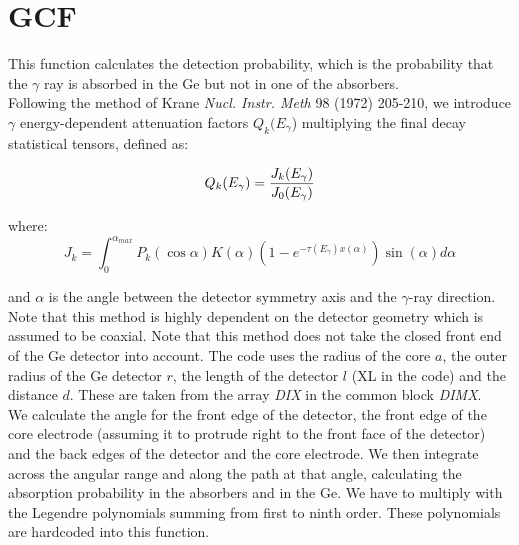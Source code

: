 \section{GCF}
\label{sect:gcf}

\noindent This function calculates the detection probability, which is the
probability that the $\gamma$ ray is absorbed in the Ge but not in one of
the absorbers.\\

\noindent Following the method of Krane {\em Nucl. Instr. Meth} 98 (1972)
205-210, we introduce $\gamma$ energy-dependent attenuation factors
$Q_k(E_\gamma$) multiplying the final decay statistical tensors, defined as:

\begin{equation}
Q_k(E_\gamma) = {J_k(E_\gamma) \over J_0(E_\gamma)}
\end{equation}

\noindent where:\\

\begin{equation}
J_k = \int_0^{\alpha_{max}}
P_k(\cos\alpha)
K(\alpha)
(1 - e^{-\tau(E_\gamma)x(\alpha)})
\sin(\alpha)
d\alpha
\end{equation}

\noindent and $\alpha$ is the angle between the detector symmetry axis and
the $\gamma$-ray direction.\\

\noindent Note that this method is highly dependent on the detector geometry
which is assumed to be coaxial. Note that this method does not take the
closed front end of the Ge detector into account. The code uses the radius
of the core $a$, the outer radius of the Ge detector $r$, the length of the
detector $l$ (XL in the code) and the distance $d$. These are taken from the
array {\em DIX} in the common block {\em DIMX}.\\

\noindent We calculate the angle for the front edge of the detector, the
front edge of the core electrode (assuming it to protrude right to the front
face of the detector) and the back edges of the detector and the core
electrode. We then integrate across the angular range and along the path at
that angle, calculating the absorption probability in the absorbers and in
the Ge. We have to multiply with the Legendre polynomials summing from first
to ninth order. These polynomials are hardcoded into this function.\\

